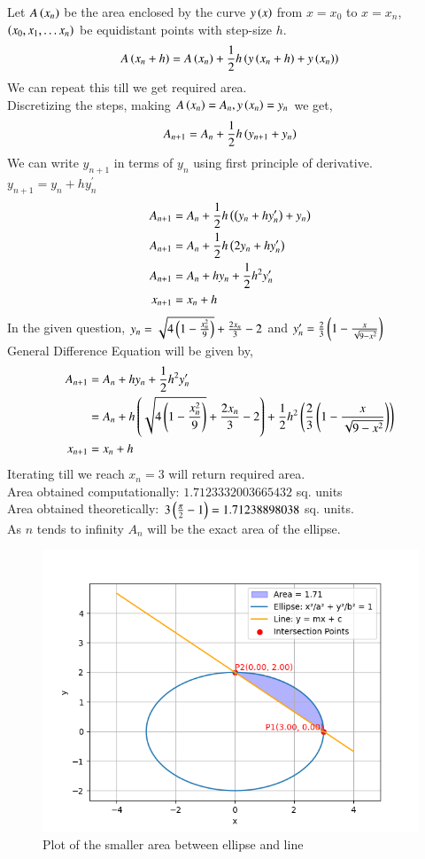 \documentclass[journal]{IEEEtran}
\begin{document}
Let $A\left(x_n\right)$ be the area enclosed by the curve $y\left(x\right)$ from $x=x_0$ to $x=x_n$, $\left(x_0, x_1, \dots x_n\right)$ be equidistant points with step-size $h$.
\begin{align}
  A\left(x_n+h\right)=A\left(x_n\right)+\frac{1}{2}h\left(y\left(x_n+h\right)+y\left(x_n\right)\right)
\end{align}
We can repeat this till we get required area.\\
Discretizing the steps, making $A\left(x_n\right)=A_n, y\left(x_n\right)=y_n$ we get,
\begin{align}
 A_{n+1}=A_n+\frac{1}{2}h\left(y_{n+1}+y_n\right)
\end{align}
We can write $y_{n+1}$ in terms of $y_n$ using first principle of derivative. $y_{n+1}=y_n+hy^{\prime}_n$
\begin{align}
  A_{n+1}&=A_n+\frac{1}{2}h\left(\left(y_{n}+hy^{\prime}_n\right)+y_n\right)\\
  A_{n+1}&=A_n+\frac{1}{2}h\left(2y_n+hy^{\prime}_n\right)\\
  A_{n+1}&=A_n+hy_n+\frac{1}{2}h^2y^{\prime}_n\\
  x_{n+1}&=x_n+h
\end{align}
In the given question, $y_n=\sqrt{4\left(1-\frac{x_n^2}{9}\right)}+\frac{2x_n}{3}-2$ and $y^{\prime}_n=\frac{2}{3}\left(1-\frac{x}{\sqrt{9-x^2}}\right)$\\
General Difference Equation will be given by,
\begin{align}
  A_{n+1}&=A_n+hy_n+\frac{1}{2}h^2y^{\prime}_n\\
  &=A_n+h\left(\sqrt{4\left(1-\frac{x_n^2}{9}\right)}+\frac{2x_n}{3}-2\right)+\frac{1}{2}h^2\left(\frac{2}{3}\left(1-\frac{x}{\sqrt{9-x^2}}\right)\right)\\
  x_{n+1}&=x_n+h
\end{align}
Iterating till we reach $x_n=3$ will return required area.\\
Area obtained computationally: $1.7123332003665432$ sq. units\\
Area obtained theoretically: $3\left(\frac{\pi}{2}-1\right)=1.71238898038$ sq. units.\\
As $n$ tends to infinity $A_n$ will be the exact area of the ellipse.
\begin{figure}[h!]
   \centering
   \includegraphics[width=1\linewidth]{figs/fig.png}
   \caption{Plot of the smaller area between ellipse and line}
   \label{stemplot}
\end{figure}
\end{document}
